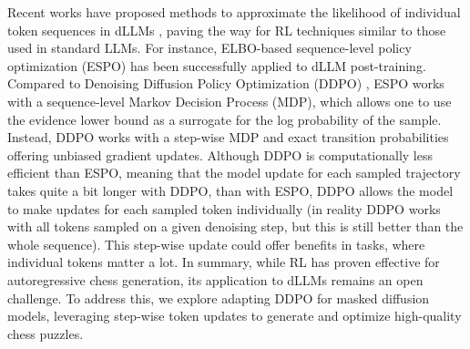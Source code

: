 Recent works have proposed methods to approximate the likelihood of individual token sequences in dLLMs \cite{ou2025principledrldiffusionllms, zhao2025d1scalingreasoningdiffusion, tang2026wd1weightedpolicyoptimization, rojas2025improvingreasoningdiffusionlanguage}, paving the way for RL techniques similar to those used in standard LLMs. For instance, ELBO-based sequence-level policy optimization (ESPO) \cite{ou2025principledrldiffusionllms} has been successfully applied to dLLM post-training. Compared to Denoising Diffusion Policy Optimization (DDPO) \cite{black2024trainingdiffusionmodelsreinforcement}, ESPO works with a sequence-level Markov Decision Process (MDP), which allows one to use the evidence lower bound as a surrogate for the log probability of the sample. Instead, DDPO works with a step-wise MDP and exact transition probabilities offering unbiased gradient updates. Although DDPO is computationally less efficient than ESPO, meaning that the model update for each sampled trajectory takes quite a bit longer with DDPO, than with ESPO, DDPO allows the model to make updates for each sampled token individually (in reality DDPO works with all tokens sampled on a given denoising step, but this is still better than the whole sequence). This step-wise update could offer benefits in tasks, where individual tokens matter a lot. In summary, while RL has proven effective for autoregressive chess generation, its application to dLLMs remains an open challenge. To address this, we explore adapting DDPO for masked diffusion models, leveraging step-wise token updates to generate and optimize high-quality chess puzzles.
